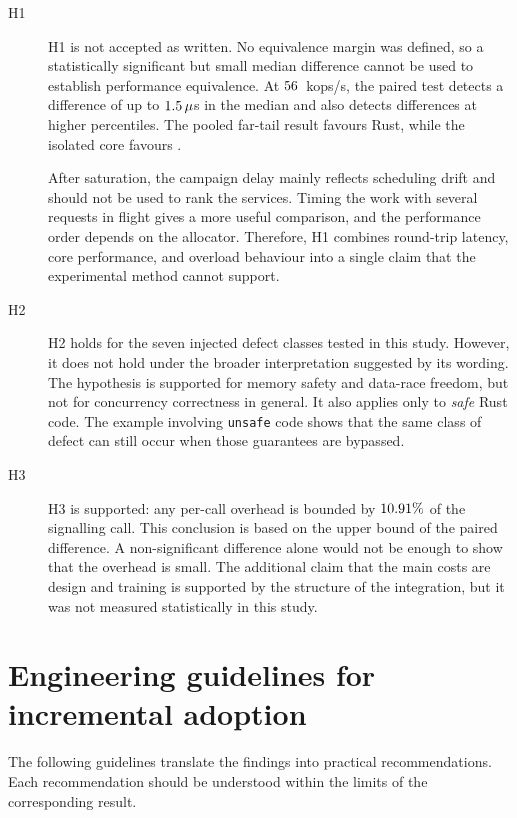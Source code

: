 \documentclass[english,oneside,a4paper,censored,csm,software-track-2020]{HYthesisML}
\begin{document}
\begin{description}
  \item[H1] H1 is not accepted as written. No equivalence margin was defined,
        so a statistically significant but small median difference cannot be
        used to establish performance equivalence. At $56$~kops/s, the
        paired test detects a difference of up to $1.5\,\mu$s in
        the median and also detects differences at higher percentiles. The
        pooled far-tail result favours Rust, while the isolated core favours
        \BudgetCoreFaster{}.

        After saturation, the campaign delay mainly reflects scheduling drift
        and should not be used to rank the services. Timing the work with
        several requests in flight gives a more useful comparison, and the
        performance order depends on the allocator. Therefore, H1 combines
        round-trip latency, core performance, and overload behaviour into a
        single claim that the experimental method cannot support.
  \item[H2] H2 holds for the seven injected defect classes tested in this study.
        However, it does not hold under the broader interpretation suggested by
        its wording. The hypothesis is supported for memory safety and
        data-race freedom, but not for concurrency correctness in general. It
        also applies only to \emph{safe} Rust code. The example involving
        \texttt{unsafe} code shows that the same class of defect can still
        occur when those guarantees are bypassed.
  \item[H3] H3 is supported: any per-call overhead is bounded by
        $10.91\%$ of the signalling call. This conclusion is based
        on the upper bound of the paired difference. A non-significant
        difference alone would not be enough to show that the overhead is small.
        The additional claim that the main costs are design and training is
        supported by the structure of the integration, but it was not measured
        statistically in this study.
\end{description}

\section{Engineering guidelines for incremental adoption}\label{sec:guidelines}
The following guidelines translate the findings into practical
recommendations. Each recommendation should be understood within the limits of
the corresponding result.
\end{document}
